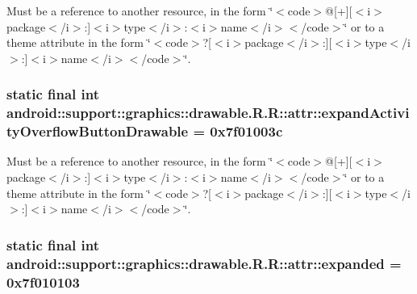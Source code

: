Must be a reference to another resource, in the form \char`\"{}$<$code$>$@\mbox{[}+\mbox{]}\mbox{[}$<$i$>$package$<$/i$>$:\mbox{]}$<$i$>$type$<$/i$>$:$<$i$>$name$<$/i$>$$<$/code$>$\char`\"{} or to a theme attribute in the form \char`\"{}$<$code$>$?\mbox{[}$<$i$>$package$<$/i$>$:\mbox{]}\mbox{[}$<$i$>$type$<$/i$>$:\mbox{]}$<$i$>$name$<$/i$>$$<$/code$>$\char`\"{}. \hypertarget{classandroid_1_1support_1_1graphics_1_1drawable_1_1_r_1_1attr_f86125efbf72db5618c9f8ab4bd91b54}{
\subsubsection[{expandActivityOverflowButtonDrawable}]{\setlength{\rightskip}{0pt plus 5cm}static final int android::support::graphics::drawable.R.R::attr::expandActivityOverflowButtonDrawable = 0x7f01003c}}
\label{classandroid_1_1support_1_1graphics_1_1drawable_1_1_r_1_1attr_f86125efbf72db5618c9f8ab4bd91b54}


Must be a reference to another resource, in the form \char`\"{}$<$code$>$@\mbox{[}+\mbox{]}\mbox{[}$<$i$>$package$<$/i$>$:\mbox{]}$<$i$>$type$<$/i$>$:$<$i$>$name$<$/i$>$$<$/code$>$\char`\"{} or to a theme attribute in the form \char`\"{}$<$code$>$?\mbox{[}$<$i$>$package$<$/i$>$:\mbox{]}\mbox{[}$<$i$>$type$<$/i$>$:\mbox{]}$<$i$>$name$<$/i$>$$<$/code$>$\char`\"{}. \hypertarget{classandroid_1_1support_1_1graphics_1_1drawable_1_1_r_1_1attr_fb42b2f7fb4883dee9cd839dba1b0bf5}{
\subsubsection[{expanded}]{\setlength{\rightskip}{0pt plus 5cm}static final int android::support::graphics::drawable.R.R::attr::expanded = 0x7f010103}}
\label{classandroid_1_1support_1_1graphics_1_1drawable_1_1_r_1_1attr_fb42b2f7fb4883dee9cd839dba1b0bf5}


